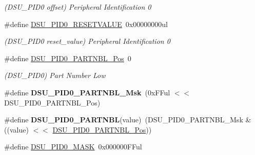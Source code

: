 \begin{DoxyCompactItemize}
\begin{DoxyCompactList}\small\item\em (D\+S\+U\+\_\+\+P\+I\+D0 offset) Peripheral Identification 0 \end{DoxyCompactList}\item 
\hypertarget{group___s_a_m_l21___d_s_u_gafbf547350eaa735fb153d3b6dcc09408}{}\#define \hyperlink{group___s_a_m_l21___d_s_u_gafbf547350eaa735fb153d3b6dcc09408}{D\+S\+U\+\_\+\+P\+I\+D0\+\_\+\+R\+E\+S\+E\+T\+V\+A\+L\+U\+E}~0x00000000ul\label{group___s_a_m_l21___d_s_u_gafbf547350eaa735fb153d3b6dcc09408}

\begin{DoxyCompactList}\small\item\em (D\+S\+U\+\_\+\+P\+I\+D0 reset\+\_\+value) Peripheral Identification 0 \end{DoxyCompactList}\item 
\hypertarget{group___s_a_m_l21___d_s_u_gaf2273a145c71eec0de2c40ddd80e4283}{}\#define \hyperlink{group___s_a_m_l21___d_s_u_gaf2273a145c71eec0de2c40ddd80e4283}{D\+S\+U\+\_\+\+P\+I\+D0\+\_\+\+P\+A\+R\+T\+N\+B\+L\+\_\+\+Pos}~0\label{group___s_a_m_l21___d_s_u_gaf2273a145c71eec0de2c40ddd80e4283}

\begin{DoxyCompactList}\small\item\em (D\+S\+U\+\_\+\+P\+I\+D0) Part Number Low \end{DoxyCompactList}\item 
\hypertarget{group___s_a_m_l21___d_s_u_ga54a82c896045decd005d66a532015c5f}{}\#define {\bfseries D\+S\+U\+\_\+\+P\+I\+D0\+\_\+\+P\+A\+R\+T\+N\+B\+L\+\_\+\+Msk}~(0x\+F\+Ful $<$$<$ D\+S\+U\+\_\+\+P\+I\+D0\+\_\+\+P\+A\+R\+T\+N\+B\+L\+\_\+\+Pos)\label{group___s_a_m_l21___d_s_u_ga54a82c896045decd005d66a532015c5f}

\item 
\hypertarget{group___s_a_m_l21___d_s_u_ga7ae8e82452e6c2e7bafadf3233ca549b}{}\#define {\bfseries D\+S\+U\+\_\+\+P\+I\+D0\+\_\+\+P\+A\+R\+T\+N\+B\+L}(value)~(D\+S\+U\+\_\+\+P\+I\+D0\+\_\+\+P\+A\+R\+T\+N\+B\+L\+\_\+\+Msk \& ((value) $<$$<$ \hyperlink{group___s_a_m_l21___d_s_u_gaf2273a145c71eec0de2c40ddd80e4283}{D\+S\+U\+\_\+\+P\+I\+D0\+\_\+\+P\+A\+R\+T\+N\+B\+L\+\_\+\+Pos}))\label{group___s_a_m_l21___d_s_u_ga7ae8e82452e6c2e7bafadf3233ca549b}

\item 
\hypertarget{group___s_a_m_l21___d_s_u_gae813809af590e3ba3aa212704b194593}{}\#define \hyperlink{group___s_a_m_l21___d_s_u_gae813809af590e3ba3aa212704b194593}{D\+S\+U\+\_\+\+P\+I\+D0\+\_\+\+M\+A\+S\+K}~0x000000\+F\+Ful\label{group___s_a_m_l21___d_s_u_gae813809af590e3ba3aa212704b194593}


\end{DoxyCompactItemize}
